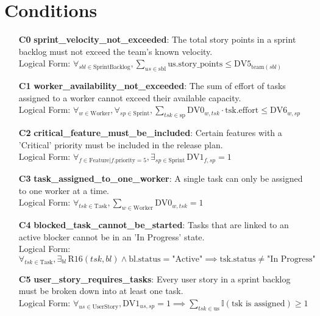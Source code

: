 \documentclass[11pt]{article}
\begin{document}
\section{Conditions}
\begin{itemize}
    \item[\textbf{C0}] \textbf{sprint\_velocity\_not\_exceeded}: The total story points in a sprint backlog must not exceed the team's known velocity. \\
    Logical Form: $\forall_{sbl \in \text{SprintBacklog}}, \sum_{us \in \text{sbl}} \text{us.story\_points} \leq \text{DV5}_{\text{team}(sbl)}$

    \item[\textbf{C1}] \textbf{worker\_availability\_not\_exceeded}: The sum of effort of tasks assigned to a worker cannot exceed their available capacity. \\
    Logical Form: $\forall_{w \in \text{Worker}}, \forall_{sp \in \text{Sprint}}, \sum_{tsk \in \text{sp}} \text{DV0}_{w, tsk} \cdot \text{tsk.effort} \leq \text{DV6}_{w, sp}$

    \item[\textbf{C2}] \textbf{critical\_feature\_must\_be\_included}: Certain features with a 'Critical' priority must be included in the release plan. \\
    Logical Form: $\forall_{f \in \text{Feature} | f.\text{priority}=5}, \exists_{sp \in \text{Sprint}} \, \text{DV1}_{f, sp} = 1$

    \item[\textbf{C3}] \textbf{task\_assigned\_to\_one\_worker}: A single task can only be assigned to one worker at a time. \\
    Logical Form: $\forall_{tsk \in \text{Task}}, \sum_{w \in \text{Worker}} \text{DV0}_{w, tsk} = 1$

    \item[\textbf{C4}] \textbf{blocked\_task\_cannot\_be\_started}: Tasks that are linked to an active blocker cannot be in an 'In Progress' state. \\
    Logical Form: $\forall_{tsk \in \text{Task}}, \exists_{bl} \, \text{R16}(tsk, bl) \land \text{bl.status} = \text{"Active"} \implies \text{tsk.status} \neq \text{"In Progress"}$

    \item[\textbf{C5}] \textbf{user\_story\_requires\_tasks}: Every user story in a sprint backlog must be broken down into at least one task. \\
    Logical Form: $\forall_{us \in \text{UserStory}}, \text{DV1}_{us, sp} = 1 \implies \sum_{tsk \in \text{us}} \mathbb{I}(\text{tsk} \text{ is assigned}) \geq 1$


\end{itemize}
\end{document}
